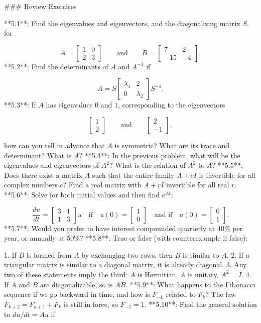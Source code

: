 

### Review Exercises

**5.1**: Find the eigenvalues and eigenvectors, and the diagonalizing matrix \(S\), for

\[A=\begin{bmatrix}1&0\\ 2&3\end{bmatrix}\qquad\text{and}\qquad B=\begin{bmatrix}7&2\\ -15&-4\end{bmatrix}.\]
**5.2**: Find the determinants of \(A\) and \(A^{-1}\) if

\[A=S\begin{bmatrix}\lambda_{1}&2\\ 0&\lambda_{2}\end{bmatrix}S^{-1}.\]
**5.3**: If \(A\) has eigenvalues \(0\) and \(1\), corresponding to the eigenvectors

\[\begin{bmatrix}1\\ 2\end{bmatrix}\qquad\text{and}\qquad\begin{bmatrix}2\\ -1\end{bmatrix},\]

how can you tell in advance that \(A\) is symmetric? What are its trace and determinant? What is \(A\)?
**5.4**: In the previous problem, what will be the eigenvalues and eigenvectors of \(A^{2}\)? What is the relation of \(A^{2}\) to \(A\)?
**5.5**: Does there exist a matrix \(A\) such that the entire family \(A+cI\) is invertible for all complex numbers \(c\)? Find a real matrix with \(A+rI\) invertible for all real \(r\).
**5.6**: Solve for both initial values and then find \(e^{At}\):

\[\frac{du}{dt}=\begin{bmatrix}3&1\\ 1&3\end{bmatrix}u\quad\text{if}\quad u(0)=\begin{bmatrix}1\\ 0\end{bmatrix}\quad\text{and if}\quad u(0)=\begin{bmatrix}0\\ 1\end{bmatrix}.\]
**5.7**: Would you prefer to have interest compounded quarterly at \(40\%\) per year, or annually at \(50\%\)?
**5.8**: True or false (with counterexample if false):

1. If \(B\) is formed from \(A\) by exchanging two rows, then \(B\) is similar to \(A\).
2. If a triangular matrix is similar to a diagonal matrix, it is already diagonal.
3. Any two of these statements imply the third: \(A\) is Hermitian, \(A\) is unitary, \(A^{2}=I\).
4. If \(A\) and \(B\) are diagonalizable, so is \(AB\).
**5.9**: What happens to the Fibonacci sequence if we go backward in time, and how is \(F_{-k}\) related to \(F_{k}\)? The law \(F_{k+2}=F_{k+1}+F_{k}\) is still in force, so \(F_{-1}=1\).
**5.10**: Find the general solution to \(du/dt=Au\) if